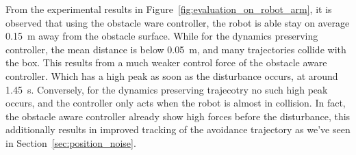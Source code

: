 From the experimental results in Figure~\ref{fig:evaluation_on_robot_arm}, it is observed that using the obstacle ware controller, the robot is able stay on average \qty{0.15}{m} away from the obstacle surface. While for the dynamics preserving controller, the mean distance is below \qty{0.05}{m}, and many trajectories collide with the box. 
This results from a much weaker control force of the obstacle aware controller. Which has a high peak as soon as the disturbance occurs, at around \qty{1.45}{s}. Conversely, for the dynamics preserving trajecotry no such high peak occurs, and the controller only acts when the robot is almost in collision. In fact, the obstacle aware controller already show high forces before the disturbance, this additionally results in improved tracking of the avoidance trajectory as we've seen in Section~\ref{sec:position_noise}.


